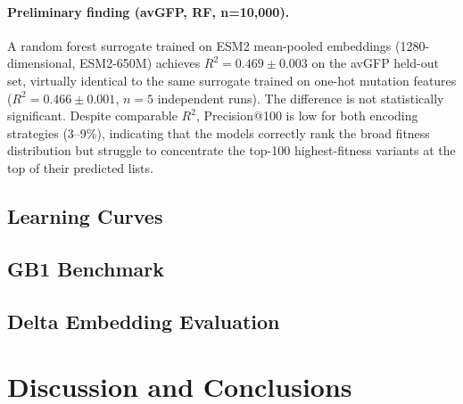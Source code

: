 \documentclass[english, 12pt, a4paper, elec, utf8, a-2b, online]{aaltothesis}
\begin{document}
\paragraph{Preliminary finding (avGFP, RF, n=10{,}000).}
A random forest surrogate trained on ESM2 mean-pooled embeddings (1280-dimensional, ESM2-650M)
achieves $R^2 = 0.469 \pm 0.003$ on the avGFP held-out set,
virtually identical to the same surrogate trained on one-hot mutation features
($R^2 = 0.466 \pm 0.001$, $n = 5$ independent runs).
The difference is not statistically significant.
Despite comparable $R^2$, Precision@100 is low for both encoding strategies (3--9\%),
indicating that the models correctly rank the broad fitness distribution but struggle to
concentrate the top-100 highest-fitness variants at the top of their predicted lists.


\subsection{Learning Curves}
\label{sec:results:learning-curves}


\subsection{GB1 Benchmark}
\label{sec:results:gb1}


\subsection{Delta Embedding Evaluation}
\label{sec:results:delta}


\clearpage

\section{Discussion and Conclusions}
\label{sec:conclusions}
\thispagestyle{empty}
\end{document}

